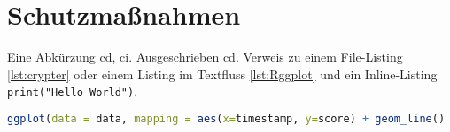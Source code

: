 \chapter{Schutzmaßnahmen}
\label{chap:kapitel3}
Eine Abkürzung \ac{cd}, \ac{ci}. Ausgeschrieben \acl{cd}. Verweis zu einem File-Listing \ref{lst:crypter} oder einem Listing im Textfluss \ref{lst:Rggplot} und ein Inline-Listing \lstinline|print("Hello World")|.



\begin{lstlisting}[language=R,caption=Beispielaufruf ldply-Funktion in R, label=lst:Rggplot]
ggplot(data = data, mapping = aes(x=timestamp, y=score) + geom_line()
\end{lstlisting}
			